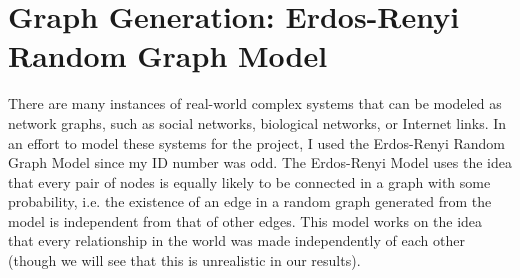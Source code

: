 \documentclass{article}
\begin{document}
\section{Graph Generation: Erdos-Renyi Random Graph Model}
    There are many instances of real-world complex systems that can be modeled
    as network graphs, such as social networks, biological networks, or
    Internet links. In an effort to model these systems for the project, I
    used the Erdos-Renyi Random Graph Model since my ID number was odd. The 
    Erdos-Renyi Model uses the idea that every pair of nodes is equally likely
    to be connected in a graph with some probability, i.e. the existence of an
    edge in a random graph generated from the model is independent from that of
    other edges. This model works on the idea that every relationship in the
    world was made independently of each other (though we will see that this
    is unrealistic in our results). 
\end{document}
